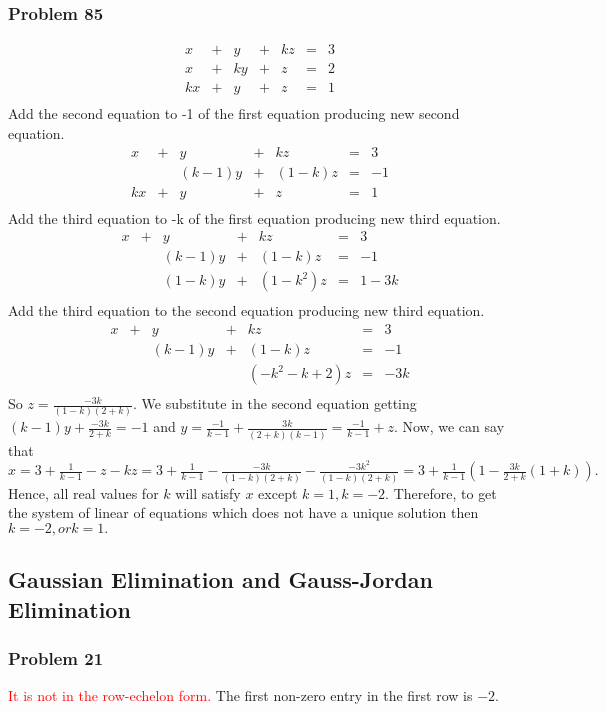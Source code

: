 \documentclass[a4paper,12pt]{article}
\begin{document}
\subsubsection*{Problem 85}
\[
\begin{array}{rrrrrrr}
x &+& y&+& kz & = & 3 \\
x &+& ky&+& z & = & 2 \\
kx&+& y &+& z & = & 1\\
\end{array}\] {Add the second equation to -1 of the first equation producing new second equation.}
\[
\begin{array}{rrrrrrr}
x &+& y&+& kz & = & 3 \\
 && (k-1)y&+& (1-k)z & = & -1 \\
kx&+& y &+& z & = & 1\\
\end{array}\]{Add the third equation to -k of the first equation producing new third equation.}
\[\begin{array}{rrrrrrr}
x &+& y&+& kz & = & 3 \\
 && (k-1)y&+& (1-k)z & = & -1 \\
&& (1-k)y &+& (1-k^2)z & = & 1-3k\\
\end{array}\] {Add the third equation to the second equation producing new third equation.}
\[\begin{array}{rrrrrrr}
x &+& y&+& kz & = & 3 \\
 && (k-1)y&+& (1-k)z & = & -1 \\
&&&& (-k^2-k+2)z & = &-3k\\
\end{array}\]
So $z=\frac{-3k}{(1-k)(2+k)}$. We substitute in the second equation getting $(k-1)y+\frac{-3k}{2+k}=-1$ and $y= \frac{-1}{k-1}+ \frac{3k}{(2+k)(k-1)} = \frac{-1}{k-1}+z$. Now, we can say that $x = 3+\frac{1}{k-1}-z-kz=3+\frac{1}{k-1}-\frac{-3k}{(1-k)(2+k)}-\frac{-3k^2}{(1-k)(2+k)} = 3+\frac{1}{k-1}(1-\frac{3k}{2+k}(1+k)).$ Hence, all real values for $k$ will satisfy $x$ except $k=1, k= -2$. Therefore, to get the system of linear of equations which does not have a unique solution then $k=-2, or k=1.$
\subsection{Gaussian Elimination and Gauss-Jordan Elimination}
\subsubsection*{Problem 21}
\textcolor{red}{It is not in the row-echelon form.} The first non-zero entry in the first row is $-2$.
\end{document}

